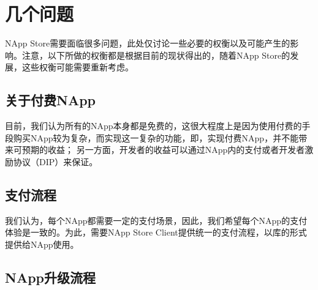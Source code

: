 \section{几个问题}
NApp Store需要面临很多问题，此处仅讨论一些必要的权衡以及可能产生的影响。注意，以下所做的权衡都是根据目前的现状得出的，随着NApp Store的发展，这些权衡可能需要重新考虑。
\subsection{关于付费NApp}
目前，我们认为所有的NApp本身都是免费的，这很大程度上是因为使用付费的手段购买NApp较为复杂，而实现这一复杂的功能，即，实现付费NApp，并不能带来可预期的收益；
另一方面，开发者的收益可以通过NApp内的支付或者开发者激励协议（DIP）来保证。
\subsection{支付流程}
我们认为，每个NApp都需要一定的支付场景，因此，我们希望每个NApp的支付体验是一致的。为此，需要NApp Store Client提供统一的支付流程，以库的形式提供给NApp使用。
\subsection{NApp升级流程}
